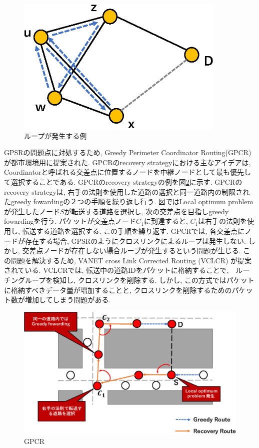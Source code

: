 \documentclass[10pt]{jreport}
\begin{document}
\begin{figure}[!ht]
	\centering
	\includegraphics[width=100mm]{figures/cross-link.eps}
	\caption{ループが発生する例}
	\label{fig:cross_link}
\end{figure}

GPSRの問題点に対処するため, Greedy Perimeter Coordinator Routing(GPCR)\cite{7}が都市環境用に提案された. GPCRのrecovery strategyにおける主なアイデアは, Coordinatorと呼ばれる交差点に位置するノードを中継ノードとして最も優先して選択することである. GPCRのrecovery strategyの例を図\ref{fig:GPCR}に示す.
GPCRのrecovery strategyは, 右手の法則を使用した道路の選択と同一道路内の制限されたgreedy fowardingの２つの手順を繰り返し行う. 図ではLocal optimum problemが発生したノード$S$が転送する道路を選択し, 次の交差点を目指しgreedy fowardingを行う. パケットが交差点ノード$C_{1}$に到達すると, $C_{1}$は右手の法則を使用し, 転送する道路を選択する. この手順を繰り返す. GPCRでは, 各交差点にノードが存在する場合, GPSRのようにクロスリンクによるループは発生しない. しかし, 交差点ノードが存在しない場合ループが発生するという問題が生じる. この問題を解決するため, VANET cross Link Corrected Routing (VCLCR) \cite{29} が提案されている. VCLCRでは, 転送中の道路IDをパケットに格納することで,　ルーチングループを検知し, クロスリンクを削除する. しかし, この方式ではパケットに格納すべきデータ量が増加することと, クロスリンクを削除するためのパケット数が増加してしまう問題がある. 

\begin{figure}[!ht]
	\centering
	\includegraphics[width=130mm]{figures/GPCR.eps}
	\caption{GPCR}
	\label{fig:GPCR}
\end{figure}
\end{document}
